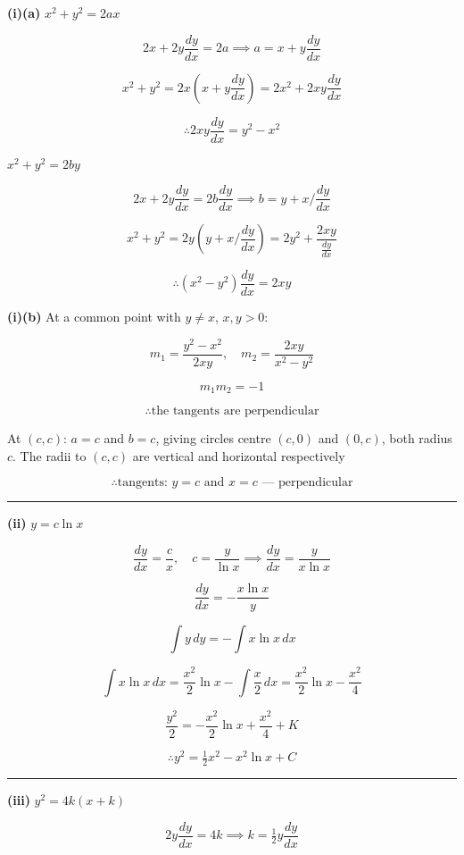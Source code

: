\documentclass[12pt]{article}
\begin{document}
\newcommand{\ds}{\displaystyle}

\textbf{(i)(a)} $x^2+y^2=2ax$

$$2x+2y\frac{dy}{dx}=2a\implies a=x+y\frac{dy}{dx}$$

$$x^2+y^2=2x\left(x+y\frac{dy}{dx}\right)=2x^2+2xy\frac{dy}{dx}$$

$$\therefore \boxed{2xy\frac{dy}{dx}=y^2-x^2}$$

\bigskip

$x^2+y^2=2by$

$$2x+2y\frac{dy}{dx}=2b\frac{dy}{dx}\implies b=y+x\bigg/\frac{dy}{dx}$$

$$x^2+y^2=2y\left(y+x\bigg/\frac{dy}{dx}\right)=2y^2+\frac{2xy}{\frac{dy}{dx}}$$

$$\therefore \boxed{\left(x^2-y^2\right)\frac{dy}{dx}=2xy}$$

\bigskip

\textbf{(i)(b)} At a common point with $y\neq x$, $x,y>0$:

$$m_1=\frac{y^2-x^2}{2xy},\quad m_2=\frac{2xy}{x^2-y^2}$$

$$m_1m_2=-1$$

$$\therefore \boxed{\text{the tangents are perpendicular}}$$

\bigskip

At $(c,c)$: $a=c$ and $b=c$, giving circles centre $(c,0)$ and $(0,c)$, both radius $c$. The radii to $(c,c)$ are vertical and horizontal respectively

$$\therefore \boxed{\text{tangents: }y=c\text{ and }x=c\text{ --- perpendicular}}$$

\bigskip\hrule\bigskip

\textbf{(ii)} $y=c\ln x$

$$\frac{dy}{dx}=\frac cx,\quad c=\frac{y}{\ln x}\implies \frac{dy}{dx}=\frac{y}{x\ln x}$$

$$\frac{dy}{dx}=-\frac{x\ln x}{y}$$

$$\int y\,dy=-\int x\ln x\,dx$$

$$\int x\ln x\,dx=\frac{x^2}{2}\ln x-\int\frac x2\,dx=\frac{x^2}{2}\ln x-\frac{x^2}{4}$$

$$\frac{y^2}{2}=-\frac{x^2}{2}\ln x+\frac{x^2}{4}+K$$

$$\therefore \boxed{y^2=\tfrac12x^2-x^2\ln x+C}$$

\bigskip\hrule\bigskip

\textbf{(iii)} $y^2=4k(x+k)$

$$2y\frac{dy}{dx}=4k\implies k=\tfrac12y\frac{dy}{dx}$$
\end{document}
